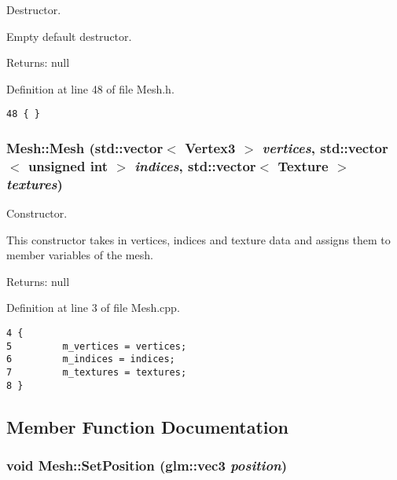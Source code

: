 Destructor. 

Empty default destructor.

\begin{Desc}
\item[Returns:]null \end{Desc}


Definition at line 48 of file Mesh.h.

\begin{Code}\begin{verbatim}48 { }
\end{verbatim}
\end{Code}


\hypertarget{class_mesh_f55e3db5357789c5de2de1f98d2cbd5b}{
\subsubsection[Mesh]{\setlength{\rightskip}{0pt plus 5cm}Mesh::Mesh (std::vector$<$ Vertex3 $>$ {\em vertices}, \/  std::vector$<$ unsigned int $>$ {\em indices}, \/  std::vector$<$ Texture $>$ {\em textures})}}
\label{class_mesh_f55e3db5357789c5de2de1f98d2cbd5b}


Constructor. 

This constructor takes in vertices, indices and texture data and assigns them to member variables of the mesh.

\begin{Desc}
\item[Returns:]null \end{Desc}


Definition at line 3 of file Mesh.cpp.

\begin{Code}\begin{verbatim}4 {
5         m_vertices = vertices;
6         m_indices = indices;
7         m_textures = textures;
8 }\end{verbatim}
\end{Code}




\subsection{Member Function Documentation}
\hypertarget{class_mesh_b847f16073bd4d5c405ffbb894cb1d62}{
\subsubsection[SetPosition]{\setlength{\rightskip}{0pt plus 5cm}void Mesh::SetPosition ({\bf glm::vec3} {\em position})}}
\label{class_mesh_b847f16073bd4d5c405ffbb894cb1d62}


